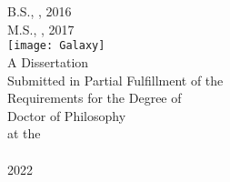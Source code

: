 \setcounter{page}{1}
\begin{center}
    	\large\textbf{\dissertationtitle}\\
    	\myname\\
	\vspace{2em}
	B.S., \bscollege , 2016\\
        M.S., \mscollege , 2017\\
        \vspace{5em}
	\texttt{[image: Galaxy]}\vspace{4em}\\
        \vfill
	A Dissertation\\ 
        Submitted in Partial Fulfillment of the\\ 
        Requirements for the Degree of\\
        Doctor of Philosophy\\
        at the\\
        \mycollege\\
        \vspace{2em}
	2022
\end{center}
\clearpage